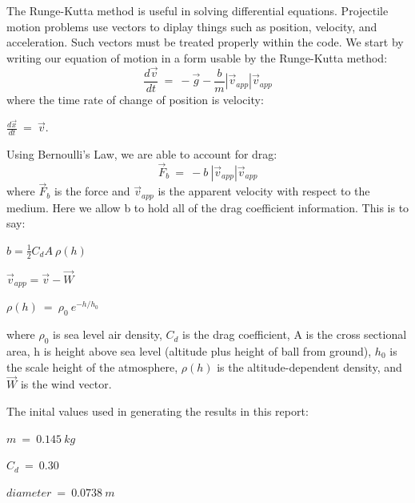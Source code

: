\documentclass[11pt]{article}
\begin{document}
The Runge-Kutta method is useful in solving differential equations.
Projectile motion problems use vectors to diplay things such as position, velocity, and acceleration.  Such vectors must be 
treated properly within the code.  We start by writing our equation of motion in a form usable by the Runge-Kutta method:
\begin{equation}
\label{force}
\frac{d\vec{v}}{dt} ~=~ -\vec{g} - \frac{b}{m} \left
        |\vec{v}_{app}\right | \vec{v}_{app}
\end{equation}
where the time rate of change of position is velocity:
\begin{center}
 $\frac{d\vec{x}}{dt} ~=~
        \vec{v}$.\\
\end{center}
Using Bernoulli's Law, we are able to account for drag:
\begin{equation}
\label{fdrag}
\vec{F}_b ~=~  -b~ \left |\vec{v}_{app}\right |
            \vec{v}_{app}
\end{equation}
where $\vec{F}_b$ is the force and $\vec{v}_{app}$ is the apparent velocity with respect to the medium.  
Here we allow b to hold all of the drag coefficient information.  This is to say:
\begin{center}
$b = \frac{1}{2} C_d A~ \rho(h)$\\
\end{center}
\begin{center}
$\vec{ v}_{app} = \vec{v} - \vec{W}$\\
\end{center}
\begin{center}
$\rho(h)~=~ \rho_0~e^{-h/h_0}$\\
\end{center}
where $\rho_{0}$ is sea level air density, $C_{d}$ is the drag coefficient, A is the cross sectional area, h is height above sea level (altitude plus height of ball from ground), $h_{0}$ is 
the scale height of the atmosphere, $\rho(h)$ is the altitude-dependent density, and $\vec{W}$ is the wind vector.


The inital values used in generating the results in this report:
\begin{center}
$m  ~=~ 0.145~kg$
\end{center}

\begin{center}
$C_{d} ~=~ 0.30$
\end{center}

\begin{center}
$diameter ~=~ 0.0738~m$
\end{center}
\end{document}

